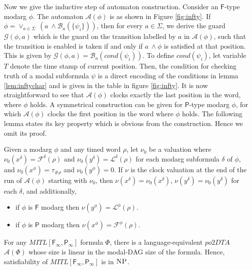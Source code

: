 \documentclass{llncs}
\newcommand{\class}{\textsc}
\newcommand{\fut}{\textsf{F}}
\newcommand{\past}{\textsf{P}}
\newcommand{\oomit}[1]{}
\newcommand{\potdta}{\mbox{$\mathit{po2DTA}$}}
\newcommand{\autm}{\mathcal A}
\newcommand{\mitlfpinf}{\mbox{$\mathit{MITL[\fut_\infty,\past_\infty]}$}}
\newcommand{\np}{\mbox{$\class{NP}$}}
\newcommand{\frst}{{\mathcal F}}
\newcommand{\lst}{{\mathcal L}}
\begin{document}
Now we give the inductive step of automaton construction. 
Consider an $\fut$-type modarg $\phi$. The automaton $\autm(\phi)$ is as shown in Figure \ref{fig:infty}. 
If $\phi = \lor_{a \in \Sigma} ~ (a~ \land {\mathscr B}_a(\{\psi_i\}))$, then for every $a\in\Sigma$, we derive the guard $\mathcal G(\phi,a)$ which is the guard on the transition labelled by $a$ in $\autm(\phi)$, such that the transition is enabled is taken if and only if $a~\land\phi$ is satisfied at that position. This is given by $\mathcal G(\phi,a) = \mathscr B_a(cond(\psi_i))$.
To define $cond(\psi_i)$, let variable $T$ denote the time stamp of current position. Then, the condition for checking truth of a modal subformula $\psi$ is a direct encoding of the conditions in lemma \ref{lem:inftychar} and is given in the table in figure \ref{fig:infty}.
 It is now straightforward to see that $\autm(\phi)$ clocks exactly the last position in the word, where $\phi$ holds.  A symmetrical construction can be given for  $\past$-type modarg $\phi$, for which $\autm(\phi)$ clocks the first position in the word where $\phi$ holds.
The following lemma states its key property which is obvious from
the construction. Hence we omit its  proof.
\begin{lemma}\label{lem:infty}
Given a  modarg $\phi$  and any timed word $\rho$, let $\nu_0$ be a valuation where $\nu_0(x^{\delta})=\frst^{\delta}(\rho)$ and 
$\nu_0(y^\delta)=\lst^{\delta}(\rho)$ for each modarg subformula $\delta$ of $\phi$, and $\nu_0(x^\phi)=\tau_{\#\rho}$ and $\nu_0(y^\phi)=0$. If
$\nu$ is the clock valuation at the end of the run of $\autm(\phi)$ starting with $\nu_0$, then
$\nu(x^\delta)=\nu_0(x^\delta)$, $\nu(y^\delta)=\nu_0(y^\delta)$ for each $\delta$, and additionally,
\begin{itemize}
\item if $\phi$ is $\fut$ modarg then $\nu(y^\phi) = \lst^\phi(\rho)$.
\item  if $\phi$ is $\past$ modarg then $\nu(x^\phi) = \frst^\phi(\rho)$.
\end{itemize}
\end{lemma}
\oomit{
\begin{proof}
Consider an $\fut$-type modarg $\phi$. The automaton $\autm(\phi)$ is as shown in figure \ref{fig:infty}. 
If $\phi = \lor_{a \in \Sigma} ~ (p_a \land {\mathscr B}_a(\{\psi_i\}))$, then for the clock $y^\phi$, and $a\in\Sigma$, we derive the guard $\mathcal G(\phi,a)$ which is the guard on the transition labelled by $a$ in $\autm(\phi)$, and which resets $y^\phi$. This is given by $\mathcal G(\phi,a) = \mathscr B_a(cond(\psi_i))$.  It is now straightforward to see that $\autm(\phi)$ clocks exactly the last position in the word, where $\phi$ holds. 
\end{proof}
}\begin{theorem}
For any \mitlfpinf\/ formula $\Phi$, there is a language-equivalent \potdta\/ $\autm(\Phi)$ whose size is linear in the modal-DAG size of the formula. Hence, satisfiability of $\mitlfpinf$ is in \np.
\end{theorem}
\end{document}
